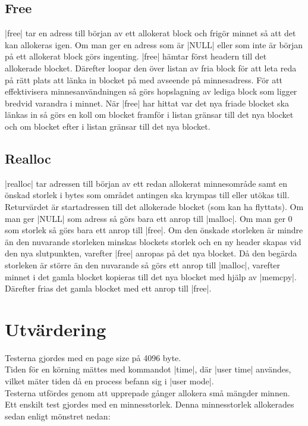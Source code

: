 \documentclass[paper=a4, fontsize=11pt]{scrartcl} %
\numberwithin{equation}{section} %
\numberwithin{figure}{section} %
\numberwithin{table}{section} %
\begin{document}
\subsection{Free}
|free| tar en adress till början av ett allokerat block och frigör minnet så
att det kan allokeras igen.
Om man ger en adress som är |NULL| eller som inte är början på ett allokerat
block görs ingenting.
|free| hämtar först headern till det allokerade blocket.
Därefter loopar den över listan av fria block för att leta reda på rätt plats
att länka in blocket på med avseende på minnesadress.
För att effektivisera minnesanvändningen så görs hopslagning av lediga block
som ligger bredvid varandra i minnet.
När |free| har hittat var det nya friade blocket ska länkas in så görs en koll
om blocket framför i listan gränsar till det nya blocket och om blocket
efter i listan gränsar till det nya blocket.

\subsection{Realloc}
|realloc| tar adressen till början av ett redan allokerat minnesområde samt
en önskad storlek i bytes som området antingen ska krympas till eller utökas
till.
Returvärdet är startadressen till det allokerade blocket (som kan ha flyttats).
Om man ger |NULL| som adress så görs bara ett anrop till |malloc|.
Om man ger 0 som storlek så görs bara ett anrop till |free|.
Om den önskade storleken är mindre än den nuvarande storleken minskas blockets
storlek och en ny header skapas vid den nya slutpunkten, varefter |free| anropas på
det nya blocket.
Då den begärda storleken är större än den nuvarande så görs ett anrop till
|malloc|, varefter minnet i det gamla blocket kopieras till det nya blocket
med hjälp av |memcpy|.
Därefter frias det gamla blocket med ett anrop till |free|.


\section{Utvärdering}

Testerna gjordes med en page size på 4096 byte.\\

Tiden för en körning mättes med kommandot |time|, där |user time| användes,
vilket mäter tiden då en process befann sig i |user mode|.\\

Testerna utfördes genom att upprepade gånger allokera små mängder minnen.
Ett enskilt test gjordes med en minnesstorlek.
Denna minnesstorlek allokerades sedan enligt mönstret nedan:
\end{document}
